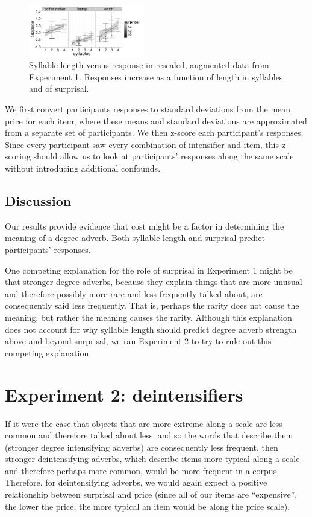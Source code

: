 \documentclass[10pt,letterpaper]{article}
\begin{document}
  \begin{figure}[ht]
  \begin{center}
  \includegraphics[width=0.45\textwidth]{exp1-scaled-syllables.png}
  \end{center}
  \caption{Syllable length versus response in rescaled, augmented data from Experiment 1. Responses increase as a function of length in syllables and of surprisal.} 
  \label{scaled-figure}
  \end{figure}
  
  We first convert participants responses to standard deviations from the mean price for each item, where these means and standard deviations are approximated from a separate set of participants. We then z-score each participant's responses. Since every participant saw every combination of intensifier and item, this z-scoring should allow us to look at participants' responses along the same scale without introducing additional confounds.
  
  \subsection{Discussion}
  
  Our results provide evidence that cost might be a factor in determining the meaning of a degree adverb. Both syllable length and surprisal predict participants' responses.
  
  One competing explanation for the role of surprisal in Experiment 1 might be that stronger degree adverbs, because they explain things that are more unusual and therefore possibly more rare and less frequently talked about, are consequently said less frequently. That is, perhaps the rarity does not cause the meaning, but rather the meaning causes the rarity. Although this explanation does not account for why syllable length should predict degree adverb strength above and beyond surprisal, we ran Experiment 2 to try to rule out this competing explanation. 
\section{Experiment 2: deintensifiers}

  If it were the case that objects that are more extreme along a scale are less common and therefore talked about less, and so the words that describe them (stronger degree intensifying adverbs) are consequently less frequent, then stronger deintensifying adverbs, which describe items more typical along a scale and therefore perhaps more common, would be more frequent in a corpus. Therefore, for deintensifying adverbs, we would again expect a positive relationship between surprisal and price (since all of our items are ``expensive'', the lower the price, the more typical an item would be along the price scale).
  
\end{document}
